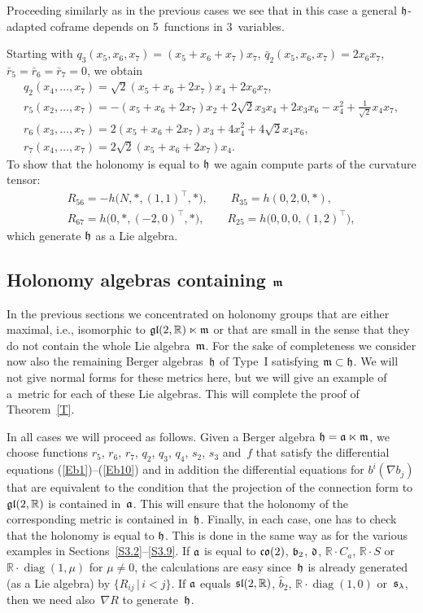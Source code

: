 \documentclass[11pt]{article}
\numberwithin{equation}{section}
\newcommand\fh{{\frak h}}
\newcommand\fm{{\frak m}}
\newcommand\fa{{\frak a}}
\newcommand\fb{{\frak b}}
\newcommand\fd{{\frak d}}
\newcommand\fs{{\frak s}}
\newcommand{\fgl}{\mathop{{\frak g \frak l}}}
\newcommand{\fsl}{\mathop{{\frak s \frak l}}}
\newcommand{\fco}{\mathop{{\frak c \frak o}}}
\newcommand\RR{{\mathbb R}}
\newcommand{\diag}{\operatorname{diag}}
\begin{document}
\begin{Remark} Proceeding similarly as in the previous cases we see that in this case a general $\fh$-adapted coframe depends on 5~functions in 3~variables.
\end{Remark}

\begin{Example} Starting with $q_3(x_5,x_6,x_7)=(x_5+ x_6+x_7)x_7$, $\bar q_2(x_5,x_6,x_7)=2x_6x_7$, $\bar r_5=\bar r_6=\bar r_7=0$, we obtain
\begin{gather*}
q_2(x_4,\dots,x_7) = \sqrt2(x_5+x_6+2 x_7)x_4+2x_6 x_7 ,\\
r_5(x_2,\dots, x_7) = -(x_5+x_6+2 x_7)x_2+2 \sqrt2 x_3x_4+2 x_3x_6-x_4^2+ \tfrac1{\sqrt2} x_4x_7,\\
r_6(x_3,\dots,x_7) = 2(x_5+x_6+2x_7) x_3+4x_4^2+4\sqrt2 x_4 x_6,\\
r_7(x_4,\dots, x_7) = 2\sqrt 2(x_5+x_6+2x_7)x_4 .
\end{gather*}
To show that the holonomy is equal to $\fh$ we again compute parts of the curvature tensor:
\begin{gather*}
 R_{56}=-h\big(N,*,(1,1)^\top,*\big),\qquad R_{35}=h(0,2,0,*),\\
 R_{67}= h\big(0,*,(-2,0)^\top,*\big),\qquad R_{25}= h\big(0,0,0,(1,2)^\top\big),
 \end{gather*}
which generate $\fh$ as a Lie algebra.
\end{Example}

\subsection[Holonomy algebras containing $\fm$]{Holonomy algebras containing $\boldsymbol{\fm}$}
In the previous sections we concentrated on holonomy groups that are either maximal, i.e., isomorphic to $\fgl(2,\RR)\ltimes\fm$ or that are small in the sense that they do not contain the whole Lie algebra~$\fm$. For the sake of completeness we consider now also the remaining Berger algebras~$\fh$ of Type~I satisfying $\fm\subset \fh$. We will not give normal forms for these metrics here, but we will give an example of a~metric for each of these Lie algebras. This will complete the proof of Theorem~\ref{T}.

In all cases we will proceed as follows. Given a Berger algebra $\fh=\fa\ltimes\fm$, we choose functions $r_5$, $r_6$, $r_7$, $q_2$, $q_3$, $q_4$, $s_2$, $s_3$ and~$f$ that satisfy the differential equations (\ref{Eb1})--(\ref{Eb10}) and in addition the differential equations for $b^i(\nabla b_j)$ that are equivalent to the condition that the projection of the connection form to $\fgl(2,\RR)$ is contained in~$\fa$. This will ensure that the holonomy of the corresponding metric is contained in~$\fh$. Finally, in each case, one has to check that the holonomy is equal to $\fh$. This is done in the same way as for the various examples in Sections~\ref{S3.2}--\ref{S3.9}. If $\fa$ is equal to $\fco(2)$, $\fb_2$, $\fd$, $\RR\cdot C_a$, $\RR\cdot S$ or~$\RR\cdot \diag(1,\mu)$ for $\mu\not=0$, the calculations are easy since~$\fh$ is already generated (as a Lie algebra) by $\{R_{ij}\,|\, i<j\}$. If $\fa$ equals $\fsl(2,\RR)$, $\hat b_2$, $\RR\cdot\diag(1,0)$ or~$\fs_\lambda$, then we need also~$\nabla R$ to generate~$\fh$.
\end{document}
